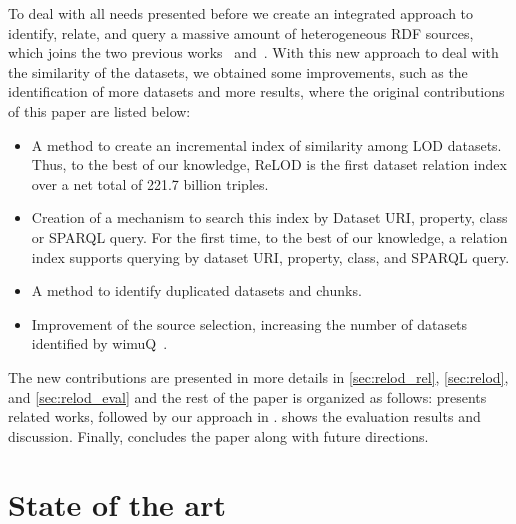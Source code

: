 \documentclass[sw]{iosart2x}
\begin{document}
To deal with all needs presented before we create an integrated approach to identify, relate, and query a massive amount of heterogeneous RDF sources, which joins the two previous works~\cite{valdestilhas2018my} and~\cite{valdestilhas2019more}.
With this new approach to deal with the similarity of the datasets, we obtained some improvements, such as the identification of more datasets and more results, where the original contributions of this paper are listed below:
\begin{itemize}
    \item A method to create an incremental index of similarity among LOD datasets. Thus, to the best of our knowledge, ReLOD is the first dataset relation index over a net total of \num{221.7} billion triples.
    \item Creation of a mechanism to search this index by Dataset URI, property, class or SPARQL query. For the first time, to the best of our knowledge, a relation index supports querying by dataset URI, property, class, and SPARQL query.
    \item A method to identify duplicated datasets and chunks.
    \item Improvement of the source selection, increasing the number of datasets identified by wimuQ~\cite{valdestilhas2019more}.
\end{itemize}

The new contributions are presented in more details in \cref{sec:relod_rel}, \cref{sec:relod}, and \cref{sec:relod_eval} and the rest of the paper is organized as follows:
 presents related works, followed by our approach in .  shows the evaluation results and discussion.
Finally,  concludes the paper along with future directions.

\section{State of the art}
\label{sec:related}
\end{document}
